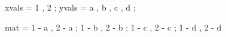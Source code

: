 xvals = 1 , 2 ;
yvals = a , b , c , d ;

% 
%
mat = 1 - a , 2 - a ; 
      1 - b , 2 - b ; 
      1 - c , 2 - c ; 
      1 - d , 2 - d
